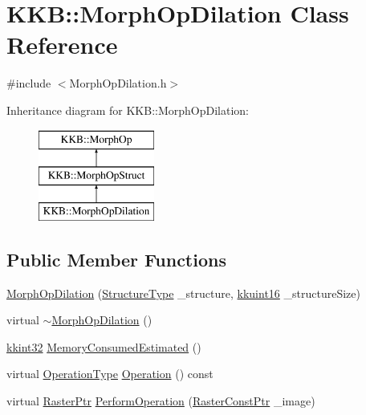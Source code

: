 \hypertarget{class_k_k_b_1_1_morph_op_dilation}{}\section{K\+KB\+:\+:Morph\+Op\+Dilation Class Reference}
\label{class_k_k_b_1_1_morph_op_dilation}


{\ttfamily \#include $<$Morph\+Op\+Dilation.\+h$>$}

Inheritance diagram for K\+KB\+:\+:Morph\+Op\+Dilation\+:\begin{figure}[H]
\begin{center}
\leavevmode
\includegraphics[height=3.000000cm]{class_k_k_b_1_1_morph_op_dilation}
\end{center}
\end{figure}
\subsection*{Public Member Functions}
\begin{DoxyCompactItemize}
\item 
\hyperlink{class_k_k_b_1_1_morph_op_dilation_ae63e8cf3ba854bda260b8ccdb35c4d7c}{Morph\+Op\+Dilation} (\hyperlink{class_k_k_b_1_1_morph_op_a09e4aff7e81327849855ff72082d85b3}{Structure\+Type} \+\_\+structure, \hyperlink{namespace_k_k_b_aa8c7d4d30381c8a0b6fce68974a9c8a9}{kkuint16} \+\_\+structure\+Size)
\item 
virtual \hyperlink{class_k_k_b_1_1_morph_op_dilation_acaf50bc342730d5667dd411dc0cfd6ac}{$\sim$\+Morph\+Op\+Dilation} ()
\item 
\hyperlink{namespace_k_k_b_a8fa4952cc84fda1de4bec1fbdd8d5b1b}{kkint32} \hyperlink{class_k_k_b_1_1_morph_op_dilation_a977057adff36427847c5abab6194f521}{Memory\+Consumed\+Estimated} ()
\item 
virtual \hyperlink{class_k_k_b_1_1_morph_op_a32070d9c14d16849873a8a409f5b0d69}{Operation\+Type} \hyperlink{class_k_k_b_1_1_morph_op_dilation_a159a05bfd9fc2af7a07fe22edcde0ef8}{Operation} () const 
\item 
virtual \hyperlink{namespace_k_k_b_a80d46bd24db644a022c863bce8ae3633}{Raster\+Ptr} \hyperlink{class_k_k_b_1_1_morph_op_dilation_a9240afda29b2a87de63fbd581bd999c0}{Perform\+Operation} (\hyperlink{namespace_k_k_b_a5acfa7402dc4df1769f90d3dc8ddfc2c}{Raster\+Const\+Ptr} \+\_\+image)
\end{DoxyCompactItemize}
